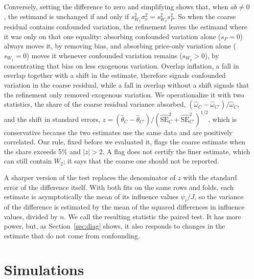 \documentclass[11pt]{article}
\theoremstyle{remark}
\begin{document}
Conversely, setting the difference to zero and simplifying shows that, when $ab \ne 0$, the estimand is unchanged if and only if $s_{W_1}^2 \sigma_v^2 = s_{W_2}^2 s_P^2$. So when the coarse residual contains confounded variation, the refinement leaves the estimand where it was only on that one equality: absorbing confounded variation alone ($s_P = 0$) always moves it, by removing bias, and absorbing price-only variation alone ($s_{W_1} = 0$) moves it whenever confounded variation remains ($s_{W_2} > 0$), by concentrating that bias on less exogenous variation. Overlap inflation, a fall in overlap together with a shift in the estimate, therefore signals confounded variation in the coarse residual, while a fall in overlap without a shift signals that the refinement only removed exogenous variation. We operationalize it with two statistics, the share of the coarse residual variance absorbed, $(\hat\omega_C - \hat\omega_{C'}) / \hat\omega_C$, and the shift in standard errors, $z = (\hat\theta_C - \hat\theta_{C'}) / (\widehat{\mathrm{SE}}_C^2 + \widehat{\mathrm{SE}}_{C'}^2)^{1/2}$, which is conservative because the two estimates use the same data and are positively correlated. Our rule, fixed before we evaluated it, flags the coarse estimate when the share exceeds 5\% and $|z| > 2$. A flag does not certify the finer estimate, which can still contain $W_2$; it says that the coarse one should not be reported.

A sharper version of the test replaces the denominator of $z$ with the standard error of the difference itself. With both fits on the same rows and folds, each estimate is asymptotically the mean of its influence values $\psi_i / J$, so the variance of the difference is estimated by the mean of the squared differences in influence values, divided by $n$. We call the resulting statistic the paired test. It has more power, but, as Section~\ref{sec:diag} shows, it also responds to changes in the estimate that do not come from confounding.

\section{Simulations}
\label{sec:sims}
\end{document}
